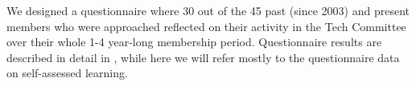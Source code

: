 \documentclass{chi2009}
\begin{document}
We designed a questionnaire where 30 out of the 45 past (since 2003) and present members who were approached reflected on their activity in the Tech Committee over their whole 1-4 year-long membership period. Questionnaire results are described in detail in \cite{bogdan_mayer09}, while here we will refer mostly to the questionnaire data on self-assessed learning.




%
%

\end{document}

